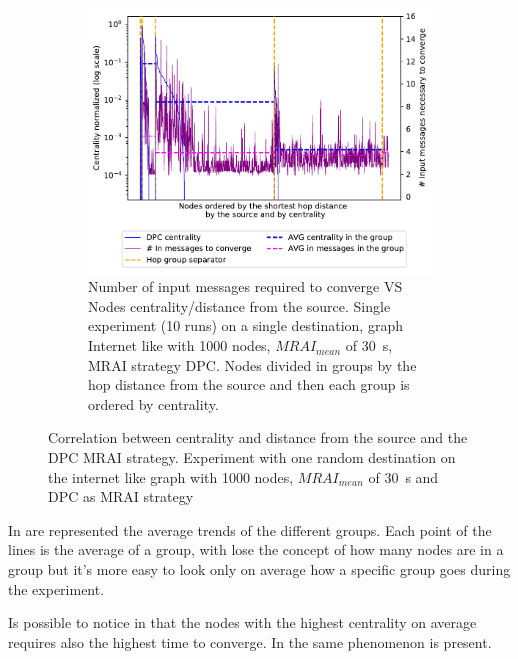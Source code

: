 \documentclass[10pt,conference,letterpaper]{IEEEtran}
\newcommand{\figwidth}{0.78}
\newcommand{\figvspace}{-1.5em}
\begin{document}
\begin{figure}[tb]
	\begin{subfigure}{\columnwidth}
		\centering
		\includegraphics[width=\figwidth\columnwidth]{images/different_destinations/1000-dpc-d0_node-conv_MRAI30_centVSmsg.pdf}
		\caption{Number of input messages required to converge VS Nodes centrality/distance from the source.
				 Single experiment (10 runs) on a single destination, graph Internet like with \num{1000} nodes, $MRAI_{mean}$ of \SI{30}{\second},
				 \ac{MRAI} strategy \ac{DPC}. Nodes divided in groups by the hop distance from the source and then each group is
				 ordered by centrality.}
		\label{fig:1000-dpc_node_conv_centVSmsg_all}
		\qquad
	\end{subfigure}

	\caption{Correlation between centrality and distance from the source and the \ac{DPC}
			 \ac{MRAI} strategy. Experiment with one random destination on the internet like graph with
			 \num{1000} nodes, $MRAI_{mean}$ of \SI{30}{\second} and \ac{DPC} as
			 \ac{MRAI} strategy}
	\label{fig:1000-dpc_node_conv_all}
	\vspace{\figvspace}
\end{figure}

In  are represented the average trends of the
different groups.
Each point of the lines is the average of a group, with lose the concept of how 
many nodes are in a group but it's more easy to look only on average how a
specific group goes during the experiment.

Is possible to notice in  that
the nodes with the highest centrality on average requires also the highest
time to converge.
In  the same phenomenon is present.
\end{document}
